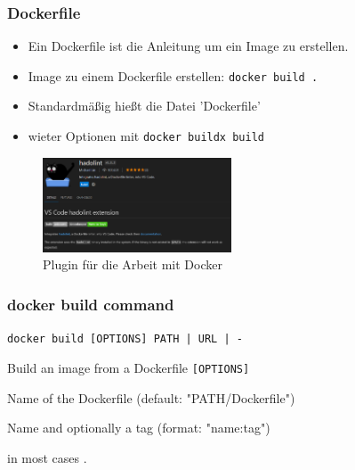 \documentclass[22pt,handout]{beamer}
\newcommand{\code}[1]{\colorbox{gray!10}{\texttt{#1}}}
\newcommand{\desclabel}[1]{\textcolor{cyan}{#1}}
\begin{document}
\begin{frame}[fragile]
    \frametitle{Dockerfile}
    \begin{itemize}
        \item Ein Dockerfile ist die Anleitung um ein Image zu erstellen.
        \item Image zu einem Dockerfile erstellen: \code{docker build .}
        \item Standardmäßig hießt die Datei 'Dockerfile'
        \item wieter Optionen mit \code{docker buildx build}
    \end{itemize}
    \begin{figure}[h]
        \centering
        \includegraphics[width=0.5\textwidth]{Bilder/Hadolint.png}
        \caption{Plugin für die Arbeit mit Docker}
    \end{figure}

\end{frame}

\begin{frame}
    \frametitle{docker build command}
    \code{docker build [OPTIONS] PATH | URL | -} 
    
    Build an image from a Dockerfile
    \code{[OPTIONS]}
    \begin{description}[labelindent=0.5cm, style=unboxed, labelwidth=\widthof{-f, --file string}, leftmargin=!]
        \item[\desclabel{-f, --file string}] Name of the Dockerfile (default: "PATH/Dockerfile")
        \item[\desclabel{-t, --tag stringArray}] Name and optionally a tag (format: "name:tag")
        \item[\desclabel{PATH}] in most cases .
    \end{description}
    
\end{frame}
\end{document}
